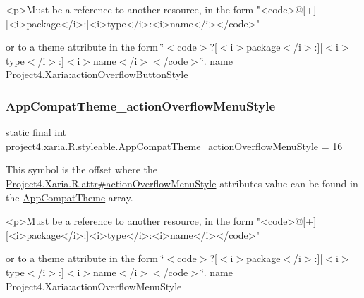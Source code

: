\begin{DoxyVerb}      <p>Must be a reference to another resource, in the form "<code>@[+][<i>package</i>:]<i>type</i>:<i>name</i></code>"
\end{DoxyVerb}
 or to a theme attribute in the form \char`\"{}$<$code$>$?\mbox{[}$<$i$>$package$<$/i$>$\+:\mbox{]}\mbox{[}$<$i$>$type$<$/i$>$\+:\mbox{]}$<$i$>$name$<$/i$>$$<$/code$>$\char`\"{}.  name Project4.\+Xaria\+:action\+Overflow\+Button\+Style \mbox{\label{classproject4_1_1xaria_1_1R_1_1styleable_a51ca3492a0dc1ccc3966dd4a59665a62}} 
\subsubsection{\texorpdfstring{App\+Compat\+Theme\+\_\+action\+Overflow\+Menu\+Style}{AppCompatTheme\_actionOverflowMenuStyle}}
{\footnotesize\ttfamily static final int project4.\+xaria.\+R.\+styleable.\+App\+Compat\+Theme\+\_\+action\+Overflow\+Menu\+Style = 16\hspace{0.3cm}{\ttfamily [static]}}

This symbol is the offset where the \hyperlink{}{Project4.\+Xaria.\+R.\+attr\#action\+Overflow\+Menu\+Style} attribute\textquotesingle{}s value can be found in the \hyperlink{classproject4_1_1xaria_1_1R_1_1styleable_aad8bec413e2350f9404e6ff0e831a85d}{App\+Compat\+Theme} array.

\begin{DoxyVerb}      <p>Must be a reference to another resource, in the form "<code>@[+][<i>package</i>:]<i>type</i>:<i>name</i></code>"
\end{DoxyVerb}
 or to a theme attribute in the form \char`\"{}$<$code$>$?\mbox{[}$<$i$>$package$<$/i$>$\+:\mbox{]}\mbox{[}$<$i$>$type$<$/i$>$\+:\mbox{]}$<$i$>$name$<$/i$>$$<$/code$>$\char`\"{}.  name Project4.\+Xaria\+:action\+Overflow\+Menu\+Style \mbox{\label{classproject4_1_1xaria_1_1R_1_1styleable_ad55044cb99752002455670fa3f2f4a28}} 
